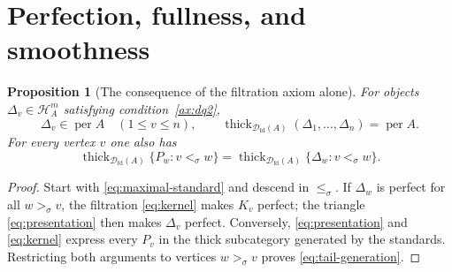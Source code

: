 \documentclass[11pt,a4paper]{article}
\newcommand{\D}{\mathcal D}
\renewcommand{\H}{\mathcal H}
\newcommand{\std}{\Delta}
\DeclareMathOperator{\fd}{fd}
\DeclareMathOperator{\thick}{thick}
\DeclareMathOperator{\per}{per}
\theoremstyle{plain}
\newtheorem{proposition}[theorem]{Proposition}
\theoremstyle{definition}
\numberwithin{equation}{section}
\begin{document}
\section{Perfection, fullness, and smoothness}\label{sec:smoothness}

\begin{proposition}[The consequence of the filtration axiom alone]
\label{prop:perfection}
For objects $\std_v\in\H_A^m$ satisfying condition~\ref{ax:dq2},
\begin{equation}\label{eq:perfect-generation}
 \std_v\in\per A\quad(1\leq v\leq n),\qquad
 \thick_{\D_{\fd}(A)}(\std_1,\ldots,\std_n)=\per A.
\end{equation}
For every vertex $v$ one also has
\begin{equation}\label{eq:tail-generation}
 \thick_{\D_{\fd}(A)}\{P_w:v<_\sigma w\}
 =\thick_{\D_{\fd}(A)}\{\std_w:v<_\sigma w\}.
\end{equation}
\end{proposition}
\begin{proof}
Start with \eqref{eq:maximal-standard} and descend in $\leq_\sigma$.
If $\std_w$ is perfect for all $w>_\sigma v$, the filtration
\eqref{eq:kernel} makes $K_v$ perfect; the triangle
\eqref{eq:presentation} then makes $\std_v$ perfect.
Conversely, \eqref{eq:presentation} and \eqref{eq:kernel} express
every $P_v$ in the thick subcategory generated by the standards.
Restricting both arguments to vertices $w>_\sigma v$ proves
\eqref{eq:tail-generation}.
\end{proof}
\end{document}
